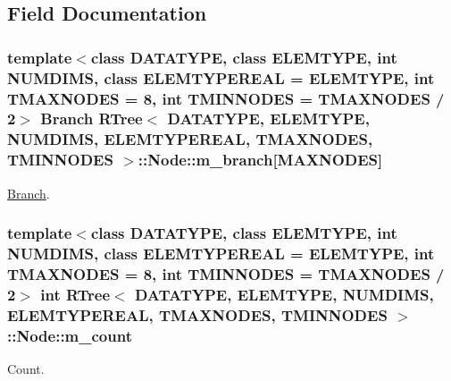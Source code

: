 \subsection{Field Documentation}
\hypertarget{structRTree_1_1Node_abc3b3eb3c889a004ca5a30628dd8775a}{
\subsubsection[{m\-\_\-branch}]{\setlength{\rightskip}{0pt plus 5cm}template$<$class D\-A\-T\-A\-T\-Y\-P\-E, class E\-L\-E\-M\-T\-Y\-P\-E, int N\-U\-M\-D\-I\-M\-S, class E\-L\-E\-M\-T\-Y\-P\-E\-R\-E\-A\-L = E\-L\-E\-M\-T\-Y\-P\-E, int T\-M\-A\-X\-N\-O\-D\-E\-S = 8, int T\-M\-I\-N\-N\-O\-D\-E\-S = T\-M\-A\-X\-N\-O\-D\-E\-S / 2$>$ {\bf Branch} {\bf R\-Tree}$<$ D\-A\-T\-A\-T\-Y\-P\-E, E\-L\-E\-M\-T\-Y\-P\-E, N\-U\-M\-D\-I\-M\-S, E\-L\-E\-M\-T\-Y\-P\-E\-R\-E\-A\-L, T\-M\-A\-X\-N\-O\-D\-E\-S, T\-M\-I\-N\-N\-O\-D\-E\-S $>$\-::Node\-::m\-\_\-branch\mbox{[}{\bf M\-A\-X\-N\-O\-D\-E\-S}\mbox{]}}}\label{structRTree_1_1Node_abc3b3eb3c889a004ca5a30628dd8775a}


\hyperlink{structRTree_1_1Branch}{Branch}. 

\hypertarget{structRTree_1_1Node_ab2393bb1bfe7c8baa84ec4f205d990ed}{
\subsubsection[{m\-\_\-count}]{\setlength{\rightskip}{0pt plus 5cm}template$<$class D\-A\-T\-A\-T\-Y\-P\-E, class E\-L\-E\-M\-T\-Y\-P\-E, int N\-U\-M\-D\-I\-M\-S, class E\-L\-E\-M\-T\-Y\-P\-E\-R\-E\-A\-L = E\-L\-E\-M\-T\-Y\-P\-E, int T\-M\-A\-X\-N\-O\-D\-E\-S = 8, int T\-M\-I\-N\-N\-O\-D\-E\-S = T\-M\-A\-X\-N\-O\-D\-E\-S / 2$>$ int {\bf R\-Tree}$<$ D\-A\-T\-A\-T\-Y\-P\-E, E\-L\-E\-M\-T\-Y\-P\-E, N\-U\-M\-D\-I\-M\-S, E\-L\-E\-M\-T\-Y\-P\-E\-R\-E\-A\-L, T\-M\-A\-X\-N\-O\-D\-E\-S, T\-M\-I\-N\-N\-O\-D\-E\-S $>$\-::Node\-::m\-\_\-count}}\label{structRTree_1_1Node_ab2393bb1bfe7c8baa84ec4f205d990ed}


Count. 

